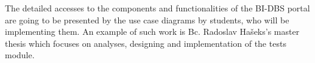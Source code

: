 \noindent The detailed accesses to the components and functionalities of the BI-DBS portal are going to be presented by the use case diagrams by students, who will be implementing them. An example of such work is Bc. Radoslav Hašeks's master thesis\cite{mt-hasek} which focuses on analyses, designing and implementation of the tests module.